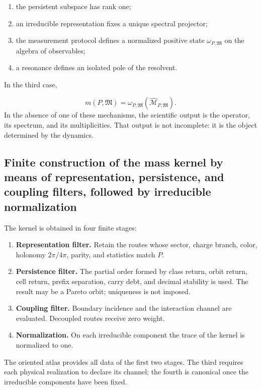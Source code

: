 \begin{enumerate}
\item the persistent subspace has rank one;
\item an irreducible representation fixes a unique spectral projector;
\item the measurement protocol defines a normalized positive state
\(\omega_{P,\mathfrak M}\) on the algebra of observables;

\item a resonance defines an isolated pole of the resolvent.
\end{enumerate}
In the third case,

\[
 m(P,\mathfrak M)
 =\omega_{P,\mathfrak M}
  (\widehat{\mathcal M}_{P,\mathfrak M}).
\]
In the absence of one of these mechanisms, the scientific output is the operator, its spectrum, and its multiplicities. That output is not incomplete: it is the object determined by the dynamics.

\subsection{Finite construction of the mass kernel by means of representation, persistence, and coupling filters, followed by irreducible normalization}
The kernel is obtained in four finite stages:

\begin{enumerate}
\item \textbf{Representation filter.} Retain the routes whose sector, charge branch,
color, holonomy \(2\pi/4\pi\), parity, and statistics match \(P\).

\item \textbf{Persistence filter.} The partial order formed by class return,
orbit return, cell return, prefix separation, carry debt, and decimal stability is used. The result may be a Pareto orbit; uniqueness is not imposed.

\item \textbf{Coupling filter.} Boundary incidence and the
interaction channel are evaluated. Decoupled routes receive zero weight.

\item \textbf{Normalization.} On each irreducible component the trace of the
kernel is normalized to one.

\end{enumerate}
The oriented atlas provides all data of the first two stages. The third requires each physical realization to declare its channel; the fourth is canonical once the irreducible components have been fixed.

